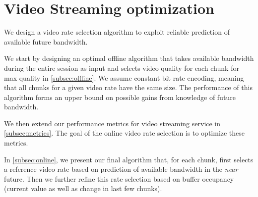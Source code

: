 \section{Video Streaming optimization}\label{sec:optimization}

We design a video rate selection algorithm to exploit reliable
prediction of available future bandwidth.


We start by designing an optimal offline algorithm
that takes available bandwidth during the entire session as input and
selects video quality for each chunk for max quality in \autoref{subsec:offline}. 
We assume constant bit rate encoding, meaning that all chunks for a given video rate have the
same size. The performance of this algorithm forms an upper bound on possible
gains from knowledge of future bandwidth.

We then extend our performance metrics for video streaming service in
\autoref{subsec:metrics}. The goal of the online video rate selection is to 
optimize these metrics.


In \autoref{subsec:online}, we present our final algorithm that, for
each chunk, first selects a reference video rate  based on prediction of 
available bandwidth in the \emph{near} future. 
Then we further refine this rate selection based on buffer occupancy
(current value as well as change in last few chunks).
%
\begin{comment}
\rks{It is not very clear if we are (a) designing a video rate
  selection algorithm that is simply better than BBA, FESTIVE,
  etc. while using the similar information as those guys,
  or (b) custom designing an algorithm to exploit knowledge of future
  bandwidth? If it is the latter, it needs to be pointed in the
  text. E.g., we can afford to be more aggressive because we have
  higher confidence in our bw estimate. If it is the former, it is a
  very strong claim that needs more validation.}

\kelvin{To answer your question, I think this might be  both, FESTIVE also uses estimated bandwidth in a conservative manner, so their stability adjustment is simpler. I tried to use
FESTIVE with prediction, but it cannot just fit in seamlessly}
\end{comment}


